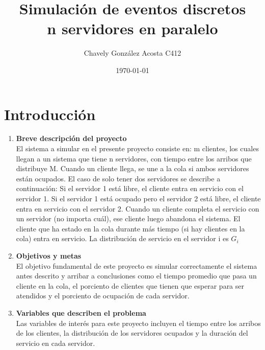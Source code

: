 \documentclass[article]{amsart}
\begin{document}
\thispagestyle{empty}
\title{
	Simulaci\'on de eventos discretos \\
	n servidores en paralelo
}
\author{Chavely Gonz\'alez Acosta C412}
\date{\today}
\maketitle
{}

\newpage


\tableofcontents

\pagestyle{fancy}
\newpage

\section{Introducci\'on}

\begin{enumerate}
\item \textbf{Breve descripción del proyecto} \\
El sistema a simular en el presente proyecto consiste en: m clientes, los cuales llegan a un sistema que tiene n servidores, con tiempo entre los arribos que distribuye M. Cuando un cliente llega, se une a la cola si ambos servidores est\'an ocupados. El caso de solo tener dos servidores se describe a continuaci\'on: Si el servidor 1 est\'a libre, el cliente entra en servicio con el servidor 1. Si el servidor 1 está ocupado pero el servidor 2 está libre, el cliente entra en servicio con el servidor 2. Cuando un cliente completa el servicio con un servidor (no importa cuál), ese cliente luego abandona el sistema. El cliente que ha estado en la cola durante más tiempo (si hay clientes en la cola) entra en servicio. La distribución de servicio en el servidor i es $ G_{i} $\\
\item \textbf{Objetivos y metas} \\
El objetivo fundamental de este proyecto es simular correctamente el sistema antes descrito y arribar a conclusiones como el tiempo promedio que pasa un cliente en la cola, el porciento de clientes que tienen que esperar para ser atendidos y el porciento de ocupaci\'on de cada servidor.\\
\item \textbf{Variables que describen el problema} \\
 Las variables de interés para este proyecto incluyen el tiempo entre los arribos de los clientes, la distribución de los servidores ocupados y la duración del servicio en cada servidor.\\
\end{enumerate}
\newpage
\end{document}

